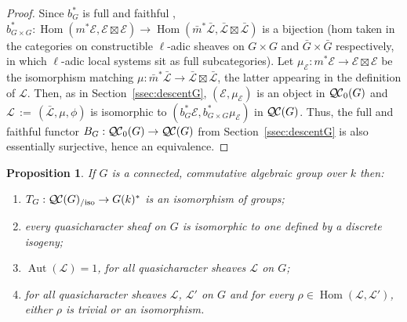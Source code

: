 \documentclass{amsart}
\theoremstyle{plain}
\newtheorem{proposition}[theorem]{Proposition}
\theoremstyle{definition}
\theoremstyle{remark}
\newcommand{\Fq}{k}
\DeclareMathOperator{\Aut}{Aut}
\DeclareMathOperator{\Hom}{Hom}
\newcommand{\ceq}{{\, :=\, }}
\newcommand{\TrFrob}[1]{T_{#1}}
\newcommand{\qcs}[1]{{\mathcal{#1}}}
\newcommand{\gqcs}[1]{{\mathcal{\bar #1}}}
\newcommand{\QC}{{\mathcal{Q\hskip-0.8pt C}}}
\newcommand{\bQC}{{\QC_0}}
\newcommand{\QCiso}[1]{\QC(#1)_{/\text{iso}}}
\begin{document}
\begin{proof}
  Since $b_G^*$ is full and faithful
  ,
  $
  b_{G\times G}^* : \Hom(m^*\qcs{E},\qcs{E}\boxtimes\qcs{E}) \to \Hom({\bar m}^*\gqcs{L},\gqcs{L}\boxtimes\gqcs{L})
  $
  is a bijection
  (hom taken in the categories on constructible $\ell$-adic sheaves on
  $G\times G$ and ${\bar G}\times {\bar G}$ respectively,
  in which $\ell$-adic local systems sit as full subcategories).
  Let $\mu_\qcs{E} : m^*\qcs{E} \to \qcs{E}\boxtimes\qcs{E}$ be the isomorphism matching
  $\mu : {\bar m}^*\gqcs{L} \to \gqcs{L}\boxtimes\gqcs{L}$,
  the latter appearing in the definition of $\qcs{L}$.
  Then, as in Section~\ref{ssec:descentG}, $(\qcs{E},\mu_\qcs{E})$ is an object in $\bQC(G)$
  and $\qcs{L} \ceq (\gqcs{L},\mu,\phi)$ is isomorphic to $(b_G^*\qcs{E},b_{G\times G}^*\mu_\qcs{E})$ in $\QC(G)$.
  Thus, the full and faithful functor $B_G : \bQC(G) \to \QC(G)$ from Section~\ref{ssec:descentG}
  is also essentially surjective, hence an equivalence.
\end{proof}

\begin{proposition}\label{prop:connected}
 If $G$ is a connected, commutative algebraic group over $\Fq$ then:
 \begin{enumerate}
 \item $\TrFrob{G} : \QCiso{G} \to G(\Fq)^*$ is an isomorphism of groups;
 \item every quasicharacter sheaf on $G$ is isomorphic to one defined by a discrete isogeny;%
 \item $\Aut(\qcs{L}) = 1$, for all quasicharacter sheaves $\qcs{L}$ on $G$;
  \item for all quasicharacter sheaves $\qcs{L}$, $\qcs{L}'$ on $G$ and for every $\rho \in \Hom(\qcs{L},\qcs{L}')$, either $\rho$ is trivial or an isomorphism.
 \end{enumerate}
 \end{proposition}
\end{document}
